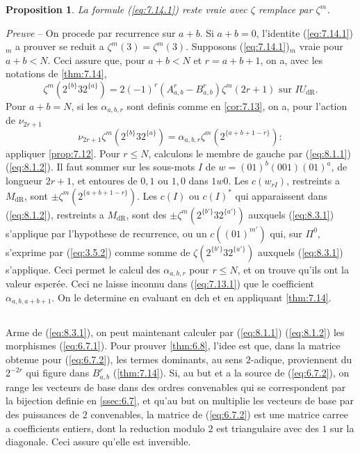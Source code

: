 \documentclass[11pt,a4paper]{article}
\theoremstyle{plain}
\newtheorem{proposition}[theorem]{Proposition}
\theoremstyle{definition}
\newcommand{\dR}{\mathrm{dR}}
\begin{document}
\begin{proposition}\label{prop:8.3}
La formule (\ref{eq:7.14.1}) reste vraie avec $\zeta$ remplace par $\zeta^m$.
\end{proposition}

\noindent \textit{Preuve} -- On procede par recurrence sur $a+b$. Si $a+b = 0$, l'identite (\ref{eq:7.14.1})$_m$ a prouver se reduit a $\zeta^m(3) = \zeta^m(3)$. Supposons (\ref{eq:7.14.1})$_m$ vraie pour $a+b < N$. Ceci assure que, pour $a+b < N$ et $r = a+b+1$, on a, avec les notations de \ref{thm:7.14},
\begin{equation}\label{eq:8.3.1}
\zeta^m(2^{\{b\}} 3 2^{\{a\}}) = 2(-1)^r (A_{a,b}^r - B_{a,b}^r) \zeta^m(2r+1) \text{ sur } IU_{\dR}.
\end{equation}
Pour $a+b = N$, si les $\alpha_{a,b,r}$ sont definis comme en \ref{cor:7.13}, on a, pour l'action de $\nu_{2r+1}$
\begin{equation}\label{eq:8.3.2}
\nu_{2r+1} \zeta^m(2^{\{b\}} 3 2^{\{a\}}) = \alpha_{a,b,r} \zeta^m(2^{\{a+b+1-r\}}):
\end{equation}
appliquer \ref{prop:7.12}. Pour $r \leq N$, calculons le membre de gauche par (\ref{eq:8.1.1}) (\ref{eq:8.1.2}). Il faut sommer sur les sous-mots $I$ de $w = (01)^b (001) (01)^a$, de longueur $2r+1$, et entoures de $0,1$ ou $1,0$ dans $1w0$. Les $c(w_{rI})$, restreints a $M_{\dR}$, sont $\pm \zeta^m(2^{\{a+b+1-r\}})$. Les $c(I)$ ou $c(I)^*$ qui apparaissent dans (\ref{eq:8.1.2}), restreints a $M_{\dR}$, sont des $\pm \zeta^m(2^{\{b'\}} 3 2^{\{a'\}})$ auxquels (\ref{eq:8.3.1}) s'applique par l'hypothese de recurrence, ou un $c((01)^{m'})$ qui, sur $\Pi^0$, s'exprime par (\ref{eq:3.5.2}) comme somme de $\zeta(2^{\{b'\}} 3 2^{\{a'\}})$ auxquels (\ref{eq:8.3.1}) s'applique. Ceci permet le calcul des $\alpha_{a,b,r}$ pour $r \leq N$, et on trouve qu'ils ont la valeur esper\'ee. Ceci ne laisse inconnu dans (\ref{eq:7.13.1}) que le coefficient $\alpha_{a,b,a+b+1}$. On le determine en evaluant en $\mathrm{dch}$ et en appliquant \ref{thm:7.14}.

\subsection{}\label{ssec:8.4}

Arme de (\ref{eq:8.3.1}), on peut maintenant calculer par (\ref{eq:8.1.1}) (\ref{eq:8.1.2}) les morphismes (\ref{eq:6.7.1}). Pour prouver \ref{thm:6.8}, l'idee est que, dans la matrice obtenue pour (\ref{eq:6.7.2}), les termes dominants, au sens $2$-adique, proviennent du $2^{-2r}$ qui figure dans $B_{a,b}^r$ (\ref{thm:7.14}). Si, au but et a la source de (\ref{eq:6.7.2}), on range les vecteurs de base dans des ordres convenables qui se correspondent par la bijection definie en \ref{ssec:6.7}, et qu'au but on multiplie les vecteurs de base par des puissances de $2$ convenables, la matrice de (\ref{eq:6.7.2}) est une matrice carree a coefficients entiers, dont la reduction modulo $2$ est triangulaire avec des $1$ sur la diagonale. Ceci assure qu'elle est inversible.
\end{document}
